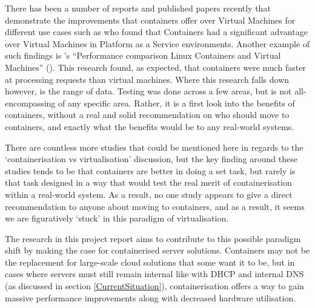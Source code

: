 
There has been a number of reports and published papers recently that demonstrate the improvements that containers offer over Virtual Machines for different use cases such as \citet{dua14} who found that Containers had a significant advantage over Virtual Machines in Platform as a Service environments. Another example of such findings is \citeauthor{joy15}'s ``Performance comparison Linux Containers and Virtual Machines'' (\citeyear{joy15}). This research found, as expected, that containers were much faster at processing requests than virtual machines. Where this research falls down however, is the range of data. Testing was done across a few areas, but is not all-encompassing of any specific area. Rather, it is a first look into the benefits of containers, without a real and solid recommendation on who should move to containers, and exactly what the benefits would be to any real-world systems.

There are countless more studies that could be mentioned here in regards to the `containerisation vs virtualisation' discussion, but the key finding around these studies tends to be that containers are better in doing a set task, but rarely is that task designed in a way that would test the real merit of containerisation within a real-world system. As a result, no one study appears to give a direct recommendation to anyone about moving to containers, and as a result, it seems we are figuratively `stuck' in this paradigm of virtualisation.

The research in this project report aims to contribute to this possible paradigm shift by making the case for containerised server solutions. Containers may not be the replacement for large-scale cloud solutions that some want it to be, but in cases where servers must still remain internal like with DHCP and internal DNS (as discussed in section \ref{CurrentSituation}), containerisation offers a way to gain massive performance improvements along with decreased hardware utilisation.

